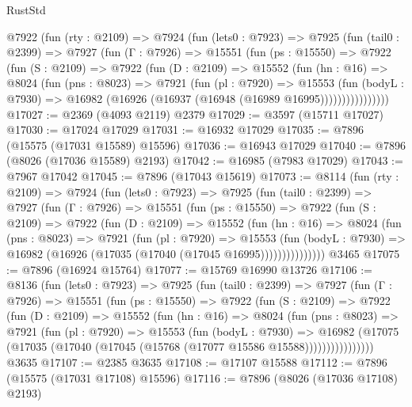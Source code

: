 \begin{lexlean}{RustStd}
\begin{coremodule}
    @7922
      (fun (rty : @2109) =>
      @7924
        (fun (lets0 : @7923) =>
        @7925
          (fun (tail0 : @2399) =>
          @7927
            (fun (Γ : @7926) =>
            @15551
              (fun (ps : @15550) =>
              @7922
                (fun (S : @2109) =>
                @7922
                  (fun (D : @2109) =>
                  @15552
                    (fun (hn : @16) =>
                    @8024
                      (fun (pns : @8023) =>
                      @7921
                        (fun (pl : @7920) =>
                        @15553
                          (fun (bodyL : @7930) =>
                          @16982 (@16926 (@16937 (@16948 (@16989 @16995))))))))))))))))
@17027 := @2369 (@4093 @2119) @2379
@17029 := @3597 (@15711 @17027)
@17030 := @17024 @17029
@17031 := @16932 @17029
@17035 := @7896 (@15575 (@17031 @15589) @15596)
@17036 := @16943 @17029
@17040 := @7896 (@8026 (@17036 @15589) @2193)
@17042 := @16985 (@7983 @17029)
@17043 := @7967 @17042
@17045 := @7896 (@17043 @15619)
@17073 := @8114
    (fun (rty : @2109) =>
    @7924
      (fun (lets0 : @7923) =>
      @7925
        (fun (tail0 : @2399) =>
        @7927
          (fun (Γ : @7926) =>
          @15551
            (fun (ps : @15550) =>
            @7922
              (fun (S : @2109) =>
              @7922
                (fun (D : @2109) =>
                @15552
                  (fun (hn : @16) =>
                  @8024
                    (fun (pns : @8023) =>
                    @7921
                      (fun (pl : @7920) =>
                      @15553
                        (fun (bodyL : @7930) =>
                        @16982 (@16926 (@17035 (@17040 (@17045 @16995)))))))))))))))
    @3465
@17075 := @7896 (@16924 @15764)
@17077 := @15769 @16990 @13726
@17106 := @8136
    (fun (lets0 : @7923) =>
    @7925
      (fun (tail0 : @2399) =>
      @7927
        (fun (Γ : @7926) =>
        @15551
          (fun (ps : @15550) =>
          @7922
            (fun (S : @2109) =>
            @7922
              (fun (D : @2109) =>
              @15552
                (fun (hn : @16) =>
                @8024
                  (fun (pns : @8023) =>
                  @7921
                    (fun (pl : @7920) =>
                    @15553
                      (fun (bodyL : @7930) =>
                      @16982
                        (@17075
                          (@17035 (@17040 (@17045 (@15768 (@17077 @15586 @15588))))))))))))))))
    @3635
@17107 := @2385 @3635
@17108 := @17107 @15588
@17112 := @7896 (@15575 (@17031 @17108) @15596)
@17116 := @7896 (@8026 (@17036 @17108) @2193)

\end{coremodule}
\end{lexlean}
